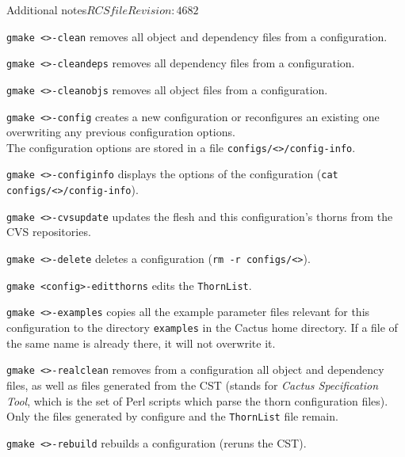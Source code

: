 \begin{cactuspart}{Additional notes}{$RCSfile$}{$Revision: 4682 $}
\begin{Lentry}
\item [\texttt{gmake <\var{config}>-clean}] removes all object and dependency
files from a configuration.

\item [\texttt{gmake <\var{config}>-cleandeps}] removes all dependency files
from a configuration.

\item [\texttt{gmake <\var{config}>-cleanobjs}] removes all object files from
  a configuration.

\item [\texttt{gmake <\var{config}>-config}] creates a new configuration or
reconfigures an existing one overwriting any previous configuration options.\\
The configuration options are stored in a file
\texttt{configs/<>/config-info}.

\item [\texttt{gmake <\var{config}>-configinfo}] displays the options
of the configuration (\texttt{cat configs/<>/config-info}).

\item[\texttt{gmake <\var{config}>-cvsupdate}] updates the flesh and this
configuration's thorns from the CVS repositories.

\item [\texttt{gmake <\var{config}>-delete}] deletes a configuration
(\texttt{rm -r configs/<>}).

\item [\texttt{gmake <config>-editthorns}] edits the \texttt{ThornList}.

\item [\texttt{gmake <\var{config}>-examples}] copies all the example parameter files relevant for this configuration to the directory \texttt{examples} in the Cactus home directory. If a file of the same name is already there, it will not overwrite it.

\item [\texttt{gmake <\var{config}>-realclean}] removes from a configuration
all object and dependency files, as well as files generated from the
CST (stands for \textit{Cactus Specification Tool}, which is the set of Perl scripts
which parse the thorn configuration files).  Only the files generated
by configure and the \texttt{ThornList} file remain.

\item [\texttt{gmake <\var{config}>-rebuild}] rebuilds a configuration (reruns the CST).


\end{Lentry}
\end{cactuspart}
